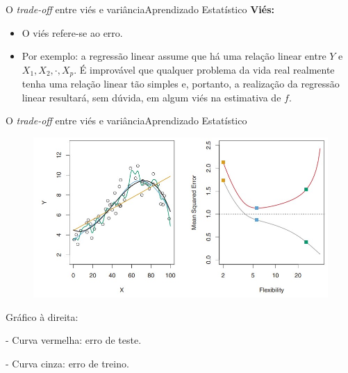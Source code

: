 \documentclass[t]{beamer}
\begin{document}

\begin{ftst}{O \textit{trade-off} entre viés e variância}{{Aprendizado Estatístico}}
\justifying
\textbf{Viés:}
\begin{itemize}
    \item O viés refere-se ao erro.
    \item Por exemplo: a regressão linear assume que há uma relação linear entre $Y$ e $X_1, X_2, \cdot, X_p$. É improvável que qualquer problema da vida real realmente tenha uma relação linear tão simples e, portanto, a realização da regressão linear resultará, sem dúvida, em algum viés na estimativa de $f$.
\end{itemize}
\end{ftst}


\begin{ftst}{O \textit{trade-off} entre viés e variância}{{Aprendizado Estatístico}}
\justifying
\begin{figure}
    \centering
    \includegraphics[scale=0.35]{Figuras/slide03_12.jpg}
\end{figure}
\small
Gráfico à direita:

- Curva vermelha: erro de teste.

- Curva cinza: erro de treino.

\end{ftst}

\end{document}
